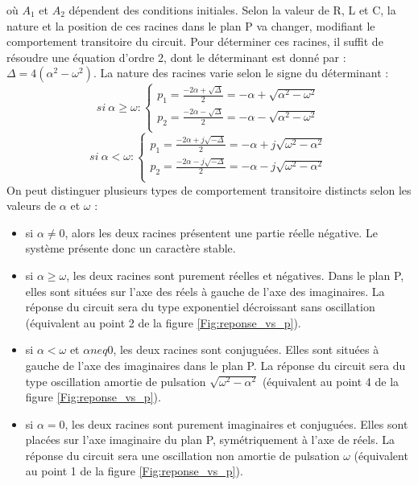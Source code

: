 \documentclass[]{book}
\begin{document}
{	 où $A_{1}$ et $A_{2}$ dépendent des conditions initiales. Selon la valeur de R, L et C, la nature et la position de ces racines dans le plan P va changer, modifiant le comportement transitoire du circuit. Pour déterminer ces racines, il suffit de résoudre une équation d'ordre 2, dont le déterminant est donné par : $\Delta = 4(\alpha^{2}-\omega^{2})$. La nature des racines varie selon le signe du déterminant :
	\begin{equation}
	si~\alpha \geq \omega : \left \{
		\begin{array}{l}
			p_{1}=\frac{-2\alpha +\sqrt{\Delta}}{2}=-\alpha+\sqrt{\alpha^{2}-\omega^{2}} \\
			p_{2}=\frac{-2\alpha -\sqrt{\Delta}}{2}=-\alpha-\sqrt{\alpha^{2}-\omega^{2}} \\
		\end{array}
	\right.
	\end{equation}
	\begin{equation}
	si~\alpha < \omega : \left \{
	\begin{array}{l}
	p_{1}=\frac{-2\alpha +j\sqrt{-\Delta}}{2}=-\alpha+j\sqrt{\omega^{2}-\alpha^{2}} \\
	p_{2}=\frac{-2\alpha -j\sqrt{-\Delta}}{2}=-\alpha-j\sqrt{\omega^{2}-\alpha^{2}} \\
	\end{array}
	\right.
	\end{equation}
	On peut distinguer plusieurs types de comportement transitoire distincts selon les valeurs de $\alpha$ et $\omega$ :
	\begin{itemize}
		\item si $\alpha \neq 0$, alors les deux racines présentent une partie réelle négative. Le système présente donc un caractère stable.
		\item si $\alpha \geq \omega$, les deux racines sont purement réelles et négatives. Dans le plan P, elles sont situées sur l'axe des réels à gauche de l'axe des imaginaires. La réponse du circuit sera du type exponentiel décroissant sans oscillation (équivalent au point 2 de la figure \ref{Fig:reponse_vs_p}).
		\item si $\alpha < \omega$ et $\alpha neq 0$, les deux racines sont conjuguées. Elles sont situées à gauche de l'axe des imaginaires dans le plan P. La réponse du circuit sera du type oscillation amortie de pulsation $\sqrt{\omega^{2}-\alpha^{2}}$ (équivalent au point 4 de la figure \ref{Fig:reponse_vs_p}). 
		\item si $\alpha = 0$, les deux racines sont purement imaginaires et conjuguées. Elles sont placées sur l'axe imaginaire du plan P, symétriquement à l'axe de réels. La réponse du circuit sera une oscillation non amortie de pulsation $\omega$ (équivalent au point 1 de la figure \ref{Fig:reponse_vs_p}). 
	\end{itemize}
	\vspace{1\baselineskip}

}
\end{document}
